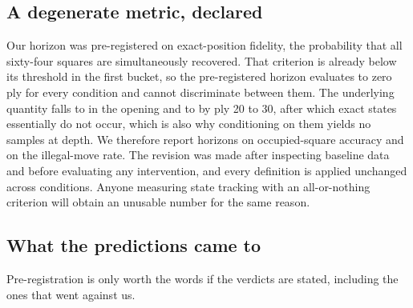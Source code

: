 \documentclass[11pt]{article}
\theoremstyle{remark}
\begin{document}
\subsection{A degenerate metric, declared}
Our horizon was pre-registered on exact-position fidelity, the probability that
all sixty-four squares are simultaneously recovered. That criterion is already
below its threshold in the first bucket, so the pre-registered horizon evaluates
to zero ply for every condition and cannot discriminate between them. The
underlying quantity falls to  in the opening and to
 by ply 20 to 30, after which exact states essentially do not
occur, which is also why conditioning on them yields no samples at depth. We
therefore report horizons on occupied-square accuracy and on the illegal-move
rate. The revision was made after inspecting baseline data and before evaluating
any intervention, and every definition is applied unchanged across conditions.
Anyone measuring state tracking with an all-or-nothing criterion will obtain an
unusable number for the same reason.

\subsection{What the predictions came to}
\label{sec:verdict}

Pre-registration is only worth the words if the verdicts are stated, including
the ones that went against us.
\end{document}
